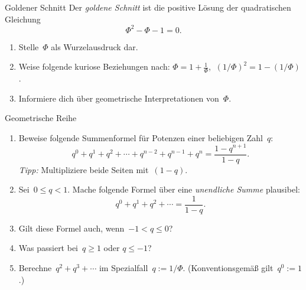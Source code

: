 \documentclass{../zirkelblatt}
\begin{document}

\begin{aufgabe}{Goldener Schnitt}
Der \emph{goldene Schnitt} ist die positive Lösung der quadratischen Gleichung
\[ \Phi^2 - \Phi - 1 = 0. \]
\begin{enumerate}
\item Stelle~$\Phi$ als Wurzelausdruck dar.
\item Weise folgende kuriose Beziehungen nach:
$\Phi = 1 + \frac{1}{\Phi}$,$\ $
$(1/\Phi)^2 = 1 - (1/\Phi)$.
\item Informiere dich über geometrische Interpretationen von~$\Phi$.
\end{enumerate}
\end{aufgabe}

\begin{aufgabe}{Geometrische Reihe}
\begin{enumerate}
\item Beweise folgende Summenformel für Potenzen einer beliebigen Zahl~$q$:
\[ q^0 + q^1 + q^2 + \cdots + q^{n-2} + q^{n-1} + q^n = \frac{1 - q^{n+1}}{1 -
q}. \]
\emph{Tipp:} Multipliziere beide Seiten mit~$(1-q)$.

\item Sei~$0 \leq q < 1$. Mache folgende Formel über eine \emph{unendliche
Summe} plausibel:
\[ q^0 + q^1 + q^2 + \cdots = \frac{1}{1 - q}. \]

\item Gilt diese Formel auch, wenn~$-1 < q \leq 0$?

\item Was passiert bei~$q \geq 1$ oder $q \leq -1$?

\item Berechne~$q^2 + q^3 + \cdots$ im Spezialfall~$q := 1/\Phi$.
{(Konventionsgemäß gilt~$q^0 := 1$.)}
\end{enumerate}
\end{aufgabe}

\end{document}
